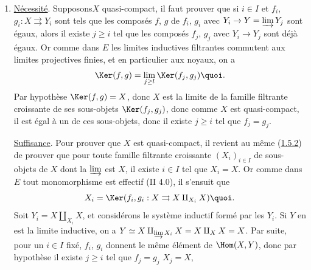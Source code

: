 \begin{enumerate}
\renewcommand{\theenumi}{\roman{enumi}}
\renewcommand{\labelenumi}{(\theenumi)}
\item \underline{Nécessité}.
Supposons\pageoriginale $X$ quasi-compact, il faut prouver que
  si $i\in I$ et $f_i$, $g_i : X \rightrightarrows Y_i$ sont tels que
  les composés $f$, $g$ de $f_i$, $g_i$ avec $Y_i \to Y = \varinjlim
  Y_j$ sont égaux, alors il existe $j \geq i$ tel que les composés
  $f_j$, $g_j$ avec $Y_i \to Y_j$ sont déjà égaux. Or comme dans $E$
  les limites inductives filtrantes commutent aux limites projectives
  finies, et en particulier aux noyaux, on a
$$
\Ker (f, g) = \mathop{\lim}_{j\geq l} \Ker (f_j, g_j){\quoi}.
$$
Par hypothèse $\Ker(f, g) = X$, donc $X$ est la limite de la famille
filtrante croissante de ses sous-objets $\Ker(f_j, g_j)$, donc comme
$X$ est quasi-compact, il est égal à un de ces sous-objets, donc il
existe $j \geq i$ tel que $f_j = g_{j}$.

\underline{Suffisance}. Pour prouver que $X$ est quasi-compact, il revient au
même (\hyperref[VI.subsubsec1.5.2]{1.5.2}) de prouver que pour toute famille filtrante croissante
$(X_i)_{i \in I}$ de sous-objets de $X$ dont la $\varinjlim$ est $X$,
il existe $i \in I$ tel que $X_i = X$. Or comme dans $E$ tout
monomorphisme est effectif (II 4.0), il s'ensuit que
$$
X_i = \Ker (f_i, g_i : X \rightrightarrows X \amalg_{X_{i}} X){\quoi}.
$$
Soit $Y_i = X \amalg_{X_i} X$, et considérons le système inductif formé
par les $Y_i$. Si $Y$ en est la limite inductive, on a $Y \simeq X
\amalg_{\varinjlim X_i} X = X \amalg_X X = X$.
Par suite, pour un $i \in I$ fixé, $f_i$, $g_i$ donnent le
même élément de $\Hom(X, Y)$, donc par hypothèse il existe $j \geq i$
tel que $f_j = g_j$ \ie $X_j = X$, \cqfd


\end{enumerate}
